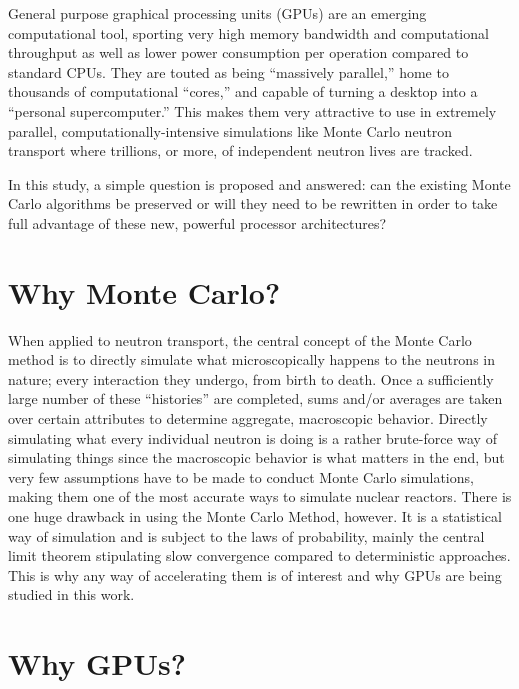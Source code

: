 General purpose graphical processing units (GPUs) are an emerging computational tool, sporting very high memory bandwidth and computational throughput as well as lower power consumption per operation compared to standard CPUs.  They are touted as being ``massively parallel,'' home to thousands of computational ``cores,'' and capable of turning a desktop into a ``personal supercomputer.''  This makes them very attractive to use in extremely parallel, computationally-intensive simulations like Monte Carlo neutron transport where trillions, or more, of independent neutron lives are tracked.  

In this study, a simple question is proposed and answered: can the existing Monte Carlo algorithms be preserved or will they need to be rewritten in order to take full advantage of these new, powerful processor architectures?

\section{Why Monte Carlo?}

When applied to neutron transport, the central concept of the Monte Carlo method is to directly simulate what  microscopically happens to the neutrons in nature; every interaction they undergo, from birth to death.  Once a sufficiently large number of these ``histories'' are completed, sums and/or averages are taken over certain attributes to determine aggregate, macroscopic behavior.  Directly simulating what every individual neutron is doing is a rather brute-force way of simulating things since the macroscopic behavior is what matters in the end, but very few assumptions have to be made to conduct Monte Carlo simulations, making them one of the most accurate ways to simulate nuclear reactors.  There is one huge drawback in using the Monte Carlo Method, however.  It is a statistical way of simulation and is subject to the laws of probability, mainly the central limit theorem stipulating slow convergence compared to deterministic approaches.  This is why any way of accelerating them is of interest and why GPUs are being studied in this work.

\section{Why GPUs?}

